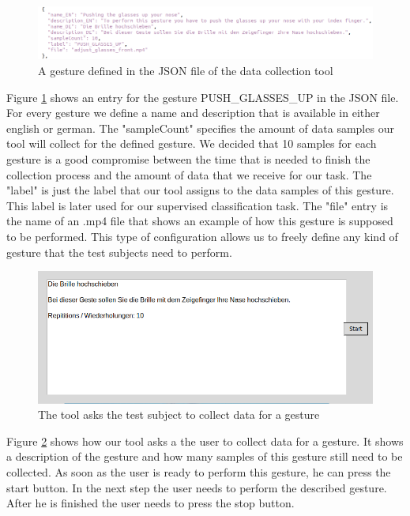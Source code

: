 \documentclass[runningheads]{llncs}
\begin{document}
\begin{figure}[ht]
\centering
\centerline{\includegraphics[width=\textwidth]{GestureJSON.png}}
\caption{A gesture defined in the JSON file of the data collection tool}
\label{fig:gesturejson}
\end{figure}
Figure \ref{fig:gesturejson} shows an entry for the gesture PUSH\_GLASSES\_UP in the JSON file. For every gesture we define a name and description that is available in either english or german. The "sampleCount" specifies the amount of data samples our tool will collect for the defined gesture. We decided that 10 samples for each gesture is a good compromise between the time that is needed to finish the collection process and the amount of data that we receive for our task. The "label" is just the label that our tool assigns to the data samples of this gesture. This label is later used for our supervised classification task. The "file" entry is the name of an .mp4 file that shows an example of how this gesture is supposed to be performed. This type of configuration allows us to freely define any kind of gesture that the test subjects need to perform.
\begin{figure}
\centering
\centerline{\includegraphics[scale=0.3]{Gesture_Description.png}}
\caption{The tool asks the test subject to collect data for a gesture}
\label{fig:gesturedatacollection}
\end{figure}
Figure \ref{fig:gesturedatacollection} shows how our tool asks a the user to collect data for a gesture. It shows a description of the gesture and how many samples of this gesture still need to be collected. As soon as the user is ready to perform this gesture, he can press the start button. In the next step the user needs to perform the described gesture. After he is finished the user needs to press the stop button. 
\end{document}
